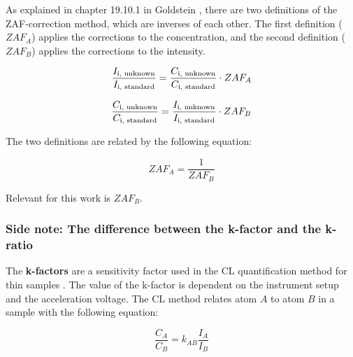 As explained in chapter 19.10.1 in Goldstein \cite[Ch. 19.10.1]{goldstein_scanning_2018}, there are two definitions of the ZAF-correction method, which are inverses of each other.
The first definition ($ZAF_A$) applies the corrections to the concentration, and the second definition ($ZAF_B$) applies the corrections to the intensity.


\begin{equation}
    \label{eq:theory:quantitative:zaf_a}
    \frac{I_\textnormal{i, unknown}}{I_\textnormal{i, standard}}  = \frac{C_\textnormal{i, unknown}}{C_\textnormal{i, standard}}\cdot ZAF_A
\end{equation}

\begin{equation}
    \label{eq:theory:quantitative:zaf_b}
    \frac{C_\textnormal{i, unknown}}{C_\textnormal{i, standard}} = \frac{I_\textnormal{i, unknown}}{I_\textnormal{i, standard}} \cdot ZAF_B
\end{equation}

The two definitions are related by the following equation:

\begin{equation}
    \label{eq:theory:quantitative:zaf_a_b_relation}
    ZAF_A = \frac{1}{ZAF_B}
\end{equation}

Relevant for this work is $ZAF_B$.





\subsubsection*{Side note: The difference between the k-factor and the k-ratio}
\label{sec:theory:quantitative:k_factor_vs_k_ratio}

The \textbf{k-factors} are a sensitivity factor used in the CL quantification method for thin samples \cite{CL1975,williams_carter_tem_2009}.
The value of the k-factor is dependent on the instrument setup and the acceleration voltage.
The CL method relates atom $A$ to atom $B$ in a sample with the following equation:

\begin{equation}
    \label{eq:theory:quantitative:cliff_lorimer}
    \frac{C_A}{C_B} = k_{AB} \frac{I_A}{I_B}
\end{equation}

